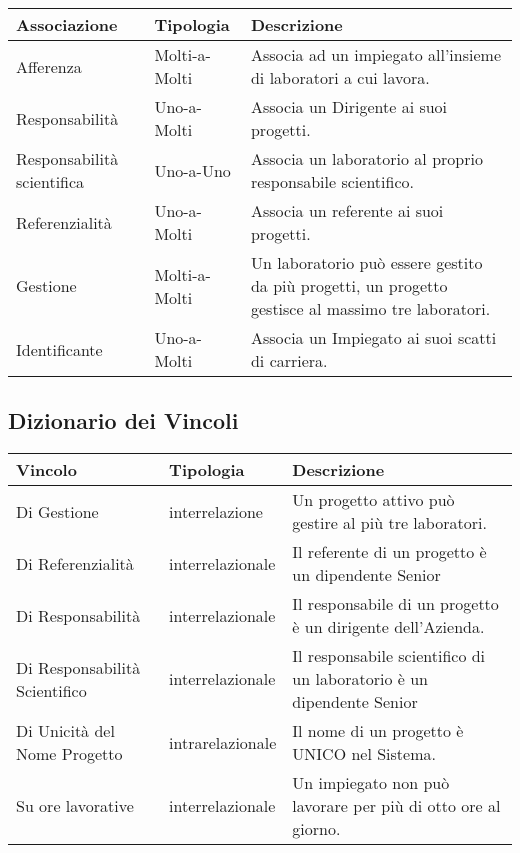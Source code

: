 \begin{table}[h!]
    \centering
    \begin{tabular}{|p{}|p{}|p{}|}
        \hline
        
        \textbf{Associazione} & \textbf{Tipologia} & \textbf{Descrizione} \\ \hline
        
        Afferenza & Molti-a-Molti & Associa ad un impiegato all'insieme di laboratori a cui lavora.
        \\ \hline
        Responsabilità & Uno-a-Molti & Associa un Dirigente ai suoi progetti.
        \\ \hline
        Responsabilità scientifica & Uno-a-Uno & Associa un laboratorio al proprio responsabile scientifico.
        \\ \hline
        Referenzialità & Uno-a-Molti & Associa un referente ai suoi progetti.
        \\ \hline
        Gestione & Molti-a-Molti & Un laboratorio può essere gestito da più progetti, un progetto gestisce al massimo tre laboratori.
        \\ \hline
        Identificante & Uno-a-Molti & Associa un Impiegato ai suoi scatti di carriera.
        \\ \hline

    \end{tabular}
\end{table}

\newpage
\subsection{Dizionario dei Vincoli}

\begin{table}[h!]
    \centering
    \begin{tabular}{|p{}|p{}|p{}|}
        \hline
        \textbf{Vincolo} & \textbf{Tipologia} & \textbf{Descrizione} \\ \hline
        
         Di Gestione & interrelazione & Un progetto attivo può gestire al più tre laboratori.
        \\ \hline
        Di Referenzialità & interrelazionale & Il referente di un progetto è un dipendente Senior
        \\ \hline
        Di Responsabilità & interrelazionale & Il responsabile di un progetto è un dirigente dell'Azienda.
        \\ \hline
        Di Responsabilità Scientifico & interrelazionale & Il responsabile scientifico di un laboratorio è un dipendente Senior
        \\ \hline
        Di Unicità del Nome Progetto & intrarelazionale & Il nome di un progetto è UNICO nel Sistema.
        \\ \hline
        Su ore lavorative& interrelazionale & Un impiegato non può lavorare per più di otto ore al giorno.
        \\ \hline
    \end{tabular}
\end{table}